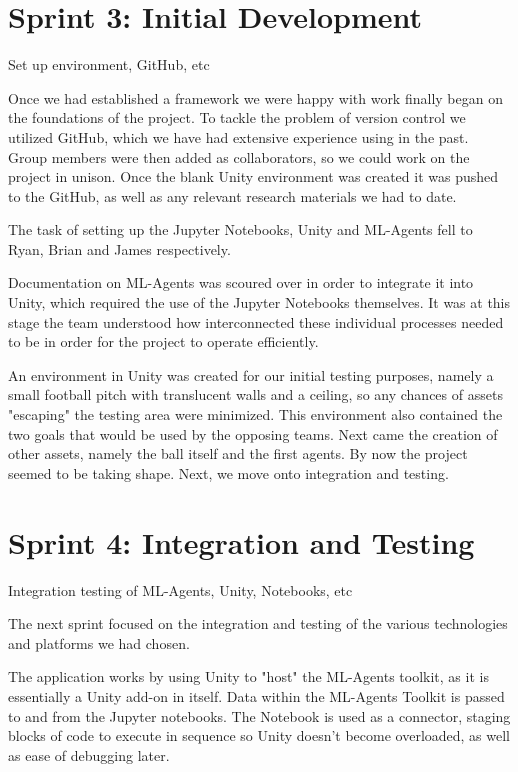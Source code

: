\section{Sprint 3: Initial Development}
	Set up environment, GitHub, etc
	
	Once we had established a framework we were happy with work finally began on the foundations of the project. To tackle the problem of version control we utilized GitHub, which we have had extensive experience using in the past. Group members were then added as collaborators, so we could work on the project in unison.  Once the blank Unity environment was created it was pushed to the GitHub, as well as any relevant research materials we had to date.
	
	The task of setting up the Jupyter Notebooks, Unity and ML-Agents fell to Ryan, Brian and James respectively.
	
	Documentation on ML-Agents was scoured over in order to integrate it into Unity, which required the use of the Jupyter Notebooks themselves. It was at this stage the team understood how interconnected these individual processes needed to be in order for the project to operate efficiently.
	
	An environment in Unity was created for our initial testing purposes, namely a small football pitch with translucent walls and a ceiling, so any chances of assets "escaping" the testing area were minimized. This environment also contained the two goals that would be used by the opposing teams. Next came the creation of other assets, namely the ball itself and the first agents. By now the project seemed to be taking shape. Next, we move onto integration and testing.
	
	

\section{Sprint 4: Integration and Testing}
	Integration testing of ML-Agents, Unity, Notebooks, etc
	
	The next sprint focused on the integration and testing of the various technologies and platforms we had chosen. 
	
	The application works by using Unity to "host" the ML-Agents toolkit, as it is essentially a Unity add-on in itself. Data within the ML-Agents Toolkit is passed to and from the Jupyter notebooks. The Notebook is used as a connector, staging blocks of code to execute in sequence so Unity doesn't become overloaded, as well as ease of debugging later.
	
